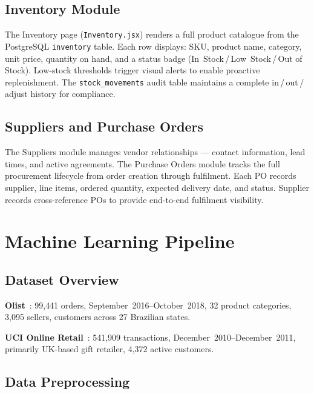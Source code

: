 \documentclass[conference]{IEEEtran}
\begin{document}
\subsection{Inventory Module}

The Inventory page (\texttt{Inventory.jsx}) renders a full product catalogue from the
PostgreSQL \texttt{inventory} table.  Each row displays: SKU, product name, category,
unit price, quantity on hand, and a status badge (In~Stock\,/\,Low~Stock\,/\,Out of
Stock).  Low-stock thresholds trigger visual alerts to enable proactive replenishment.
The \texttt{stock\_movements} audit table maintains a complete in\,/\,out\,/\,adjust
history for compliance.

\subsection{Suppliers and Purchase Orders}

The Suppliers module manages vendor relationships — contact information, lead times, and
active agreements.  The Purchase Orders module tracks the full procurement lifecycle
from order creation through fulfilment.  Each PO records supplier, line items, ordered
quantity, expected delivery date, and status.  Supplier records cross-reference POs to
provide end-to-end fulfilment visibility.

\section{Machine Learning Pipeline}

\subsection{Dataset Overview}

\textbf{Olist}~\cite{olist2018}: 99{,}441 orders, September~2016–October~2018,
32 product categories, 3{,}095 sellers, customers across 27 Brazilian states.

\textbf{UCI Online Retail}~\cite{online_retail2015}: 541{,}909 transactions,
December~2010–December~2011, primarily UK-based gift retailer, 4{,}372 active customers.

\subsection{Data Preprocessing}
\end{document}
